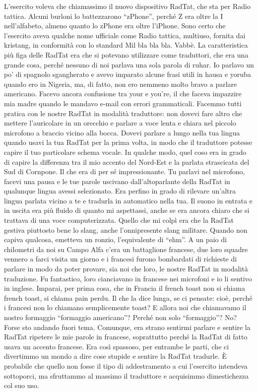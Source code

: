 L'esercito voleva che chiamassimo il nuovo dispositivo RadTat, che sta
per Radio tattica. Alcuni burloni lo battezzarono ``zPhone'', perché Z
era oltre la I nell'alfabeto, almeno quanto lo zPhone era oltre
l'iPhone. Sono certo che l'esercito aveva qualche nome ufficiale come
Radio tattica, multiuso, fornita dai kristang, in conformità con lo
standard Mil bla bla bla. Vabbè. La caratteristica più figa delle RadTat
era che si potevano utilizzare come traduttori, che era una grande cosa,
perché nessuno di noi parlava una sola parola di ruhar. Io parlavo un
po' di spagnolo sgangherato e avevo imparato alcune frasi utili in hausa
e yoruba quando ero in Nigeria, ma, di fatto, non ero nemmeno molto
bravo a parlare americano. Facevo ancora confusione tra your e you're,
il che faceva impazzire mia madre quando le mandavo e-mail con errori
grammaticali. Facemmo tutti pratica con le nostre RadTat in modalità
traduttore: non dovevi fare altro che mettere l'auricolare in un
orecchio e parlare a voce lenta e chiara nel piccolo microfono a braccio
vicino alla bocca. Dovevi parlare a lungo nella tua lingua quando usavi
la tua RadTat per la prima volta, in modo che il traduttore potesse
capire il tuo particolare schema vocale. In qualche modo, quel coso era
in grado di capire la differenza tra il mio accento del Nord-Est e la
parlata strascicata del Sud di Cornpone. Il che era di per sé
impressionante. Tu parlavi nel microfono, facevi una pausa e le tue
parole uscivano dall'altoparlante della RadTat in qualunque lingua
avessi selezionato. Era perfino in grado di rilevare un'altra lingua
parlata vicino a te e tradurla in automatico nella tua. Il suono in
entrata e in uscita era più fluido di quanto mi aspettassi, anche se era
ancora chiaro che si trattava di una voce computerizzata. Quello che mi
colpì era che la RadTat gestiva piuttosto bene lo slang, anche
l'onnipresente slang militare. Quando non capiva qualcosa, emetteva un
ronzio, l'equivalente di ``ehm''. A un paio di chilometri da noi su
Campo Alfa c'era un battaglione francese, due loro squadre vennero a
farci visita un giorno e i francesi furono bombardati di richieste di
parlare in modo da poter provare, sia noi che loro, le nostre RadTat in
modalità traduzione. Fu fantastico, loro cianciavano in francese nei
microfoni e io li sentivo in inglese. Imparai, per prima cosa, che in
Francia il french toast non si chiama french toast, si chiama pain
perdu. Il che la dice lunga, se ci pensate: cioè, perché i francesi non
lo chiamano semplicemente toast? E allora noi che chiamavamo il nostro
formaggio ``formaggio americano''? Perché non solo ``formaggio''? No?
Forse sto andando fuori tema. Comunque, era strano sentirmi parlare e
sentire la RadTat ripetere le mie parole in francese, soprattutto perché
la RadTat di fatto usava un accento francese. Era così spassoso, per
entrambe le parti, che ci divertimmo un mondo a dire cose stupide e
sentire la RadTat tradurle. È probabile che quello non fosse il tipo di
addestramento a cui l'esercito intendeva sottoporci, ma sfruttammo al
massimo il traduttore e acquisimmo dimestichezza col suo uso.


